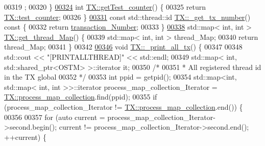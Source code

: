 \begin{DoxyCode}
00319 ;
00320 \}
\hypertarget{_t_x_8cpp_source.tex_l00324}{}\hyperlink{class_t_x_ae9bf97930c4670f59d334b345353a71e_ae9bf97930c4670f59d334b345353a71e}{00324} \textcolor{keywordtype}{int} \hyperlink{class_t_x_ae9bf97930c4670f59d334b345353a71e_ae9bf97930c4670f59d334b345353a71e}{TX::getTest\_counter}() \{
00325     \textcolor{keywordflow}{return} \hyperlink{class_t_x_a25838234aab99ae891a90eb8623a8b3c_a25838234aab99ae891a90eb8623a8b3c}{TX::test\_counter};
00326 \}
\hypertarget{_t_x_8cpp_source.tex_l00331}{}\hyperlink{class_t_x_a9eba04944d449285905b60ec47223cff_a9eba04944d449285905b60ec47223cff}{00331} \textcolor{keyword}{const} std::thread::id \hyperlink{class_t_x_a9eba04944d449285905b60ec47223cff_a9eba04944d449285905b60ec47223cff}{TX::\_get\_tx\_number}()\textcolor{keyword}{ const }\{
00332     \textcolor{keywordflow}{return} \hyperlink{class_t_x_a145a1c74b521f277fe481971a930b249_a145a1c74b521f277fe481971a930b249}{transaction\_Number};
00333 \}
\hypertarget{_t_x_8cpp_source.tex_l00338}{}\hyperlink{class_t_x_a3f5671423cb7b9f9c98f8a25f2a4b545_a3f5671423cb7b9f9c98f8a25f2a4b545}{00338} std::map< int, int > \hyperlink{class_t_x_a3f5671423cb7b9f9c98f8a25f2a4b545_a3f5671423cb7b9f9c98f8a25f2a4b545}{TX::get\_thread\_Map}() \{
00339     std::map< int, int > thread\_Map;
00340     \textcolor{keywordflow}{return} thread\_Map;
00341 \}
00342 
\hypertarget{_t_x_8cpp_source.tex_l00346}{}\hyperlink{class_t_x_a3d96ed91eb9ec73e16589f705661c5a7_a3d96ed91eb9ec73e16589f705661c5a7}{00346} \textcolor{keywordtype}{void} \hyperlink{class_t_x_a3d96ed91eb9ec73e16589f705661c5a7_a3d96ed91eb9ec73e16589f705661c5a7}{TX::\_print\_all\_tx}() \{
00347 
00348     std::cout << \textcolor{stringliteral}{"[PRINTALLTHREAD]"} << std::endl;
00349     std::map< int, std::shared\_ptr<OSTM> >::iterator it;
00350     \textcolor{comment}{/*}
00351 \textcolor{comment}{     * All registered thread id in the TX global }
00352 \textcolor{comment}{     */}
00353     \textcolor{keywordtype}{int} ppid = getpid();
00354     std::map<int, std::map< int, int >>::iterator process\_map\_collection\_Iterator = 
      \hyperlink{class_t_x_aea5b8eedcd5059384155576b3979a5f6_aea5b8eedcd5059384155576b3979a5f6}{TX::process\_map\_collection}.find(ppid);
00355     \textcolor{keywordflow}{if} (process\_map\_collection\_Iterator != \hyperlink{class_t_x_aea5b8eedcd5059384155576b3979a5f6_aea5b8eedcd5059384155576b3979a5f6}{TX::process\_map\_collection}.end()) \{
00356 
00357         \textcolor{keywordflow}{for} (\textcolor{keyword}{auto} current = process\_map\_collection\_Iterator->second.begin(); current != 
      process\_map\_collection\_Iterator->second.end(); ++current) \{

\end{DoxyCode}

